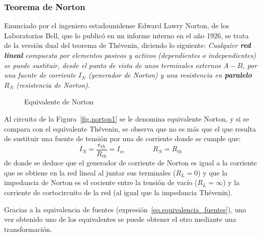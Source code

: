 \documentclass[11pt]{book} %
\begin{document}
\subsubsection{Teorema de Norton}
Enunciado por el ingeniero estadounidense Edward Lawry Norton, de los Laboratorios Bell, que lo publicó en un informe interno en el año 1926, se trata de la versión dual del teorema de Thévenin, diciendo lo siguiente: \textit{Cualquier \textbf{red lineal} compuesta por elementos pasivos y activos (dependientes o independientes) se puede sustituir, desde el punto de vista de unos terminales externos $A-B$, por una fuente de corriente $I_{N}$ (generador de Norton) y una resistencia en \textbf{paralelo} $R_{N}$ (resistencia de Norton)}. 
\begin{figure}[htbp]
        \centering
        \hfil
        \caption{Equivalente de Norton}
        \label{fig.norton}
    \end{figure}

Al circuito de la Figura~\ref{fig.norton1} se le denomina equivalente Norton, y si se compara con el equivalente Thévenin, se observa que no es más que el que resulta de sustituir una fuente de tensión por una de corriente donde se cumple que: 
\begin{equation}
    \boxed{I_N=\dfrac{\epsilon_{th}}{R_{th}}= I_{cc}} \qquad\qquad \boxed{R_N=R_{th}}
\end{equation}
de donde se deduce que el generador de corriente de Norton es igual a la corriente que se obtiene en la red lineal al juntar sus terminales ($R_L=0$) y que la impedancia de Norton es el cociente entre la tensión de vacío ($R_L=\infty$) y la corriente de cortocircuito de la red (al igual que la impedancia Thévenin).
\begin{remark}
    Gracias a la equivalencia de fuentes (expresión~\eqref{eq.equivalencia_fuentes}), una vez obtenido uno de los equivalentes se puede obtener el otro mediante una transformación.
\end{remark}
\end{document}
